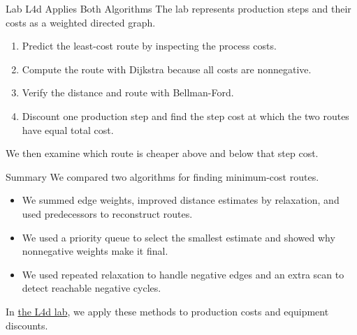 \documentclass[aspectratio=169,11pt]{beamer}
\begin{document}
\begin{frame}{Lab L4d Applies Both Algorithms}
  The lab represents production steps and their costs as a weighted directed graph.

  \vspace{0.7em}
  \begin{enumerate}\setlength{\itemsep}{0.7em}
    \item Predict the least-cost route by inspecting the process costs.
    \item Compute the route with Dijkstra because all costs are nonnegative.
    \item Verify the distance and route with Bellman-Ford.
    \item Discount one production step and find the step cost at which the two
      routes have equal total cost.
  \end{enumerate}

  \vspace{0.6em}
  We then examine which route is cheaper above and below that step cost.
\end{frame}

\begin{frame}{Summary}
  We compared two algorithms for finding minimum-cost routes.

  \vspace{0.7em}
  {\large\textbf{}}
  \vspace{0.35em}
  \begin{itemize}\setlength{\itemsep}{0.6em}
    \item \textbf{} We summed edge weights,
      improved distance estimates by relaxation, and used predecessors to reconstruct routes.
    \item \textbf{} We used a priority queue to select
      the smallest estimate and showed why nonnegative weights make it final.
    \item \textbf{} We used repeated relaxation
      to handle negative edges and an extra scan to detect reachable negative cycles.
  \end{itemize}

  \vspace{0.5em}
  In \href{https://github.com/varnerlab/CHEME-5800-CourseRepository-Fall-2026/blob/main/weeks/week-04/L4d/CHEME-5800-L4d-Lab-ProductionPlanningShortestPath-Fall-2026.ipynb}{the L4d lab},
  we apply these methods to production costs and equipment discounts.
\end{frame}

\end{document}

